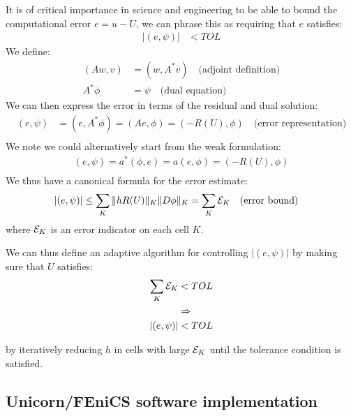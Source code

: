 It is of critical importance in science and engineering to be able to
bound the computational error $e = u - U$, we can phrase this as
requiring that $e$ satisfies:
\begin{align}
|(e, \psi)| &< TOL
\end{align}
We define:
\begin{displaymath}
  \begin{split}
    (Aw, v) &= (w, A^* v) \quad \text{(adjoint definition)}\\
    A^* \phi &= \psi \quad \text{(dual equation)}
  \end{split}
\end{displaymath}
We can then express the error in terms of the residual and dual solution:
\begin{displaymath}
  \begin{split}
    (e, \psi) &= (e, A^*\phi) = (Ae, \phi) = (-R(U), \phi)  \quad \text{(error representation)}\\
  \end{split}
\end{displaymath}
We note we could alternatively start from the weak formulation:
\begin{displaymath}
  \begin{split}
(e, \psi) = a^*(\phi, e) = a(e, \phi) = (-R(U), \phi)\\
  \end{split}
\end{displaymath}
We thus have a canonical formula for the error estimate:
\begin{displaymath}
  \begin{split} |(e, \psi)| &\leq \sum_K \|h R(U)\|_K \|D \phi\|_K
  = \sum_K {\cal E}_K \quad \text{(error bound)} \end{split}
\end{displaymath}
where ${\cal E}_K$ is an error indicator on each cell $K$.

We can thus define an adaptive algorithm for controlling
$|(e, \psi)|$ by making sure that $U$ satisfies:
\begin{align*}
\sum_K {\cal E}_K &< TOL\\
&\Rightarrow\\
|(e, \psi)| &< TOL
\end{align*}

by iteratively reducing $h$ in cells with large ${\cal E}_K$ until the
tolerance condition is satisfied.

\subsection{Unicorn/FEniCS software implementation}

